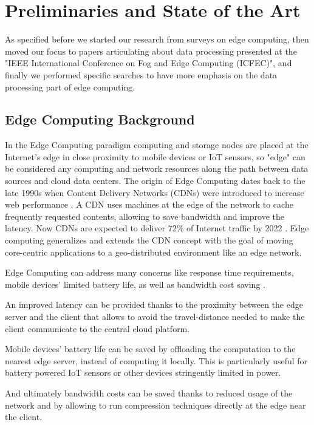 \chapter{Preliminaries and State of the Art}
\label{ch:preliminaries_and_sota}
As specified before we started our research from surveys on edge computing, then moved our focus to papers articulating about data processing presented at the "IEEE International Conference on Fog and Edge Computing (ICFEC)", and finally we performed specific searches to have more emphasis on the data processing part of edge computing.


\section{Edge Computing Background}
In the Edge Computing paradigm computing and storage nodes are placed at the Internet’s edge in close proximity to mobile devices or IoT sensors, so "edge" can be considered any computing and network resources along the path between data sources and cloud data centers.
The origin of Edge Computing dates back to the late 1990s when Content Delivery Networks (CDNs) were introduced to increase web performance \cite{edge-computing-origin}. A CDN uses machines at the edge of the network to cache frequently requested contents, allowing to save bandwidth and improve the latency. Now CDNs are expected to deliver 72\% of Internet traffic by 2022 \cite{cdn-usage}. Edge computing generalizes and extends the CDN concept with the goal of moving core-centric applications to a geo-distributed environment like an edge network.

Edge Computing can address many concerns like response time requirements, mobile devices' limited battery life, as well as bandwidth cost saving \cite{emergence-edge-computing}.

An improved latency can be provided thanks to the proximity between the edge server and the client that allows to avoid the travel-distance needed to make the client communicate to the central cloud platform.

Mobile devices' battery life can be saved by offloading the computation to the nearest edge server, instead of computing it locally. This is particularly useful for battery powered IoT sensors or other devices stringently limited in power.

And ultimately bandwidth costs can be saved thanks to reduced usage of the network and by allowing to run compression techniques directly at the edge near the client.


